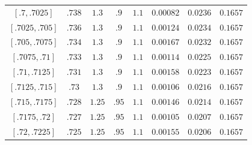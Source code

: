 \documentclass[11pt]{amsart}
\numberwithin{equation}{section}
\theoremstyle{plain}
\theoremstyle{definition}
\theoremstyle{remark}
\newcommand{\1}{\mathbf{1}}
\begin{document}
\begin{center}
\begin{longtable}{@{}cccccccc@{}}
$[.7,.7025]$ & $.738$ & $1.3$ & $.9$ & $1.1$ & $0.00082$ & $0.0236$ & $0.1657$ \\
$[.7025,.705]$ & $.736$ & $1.3$ & $.9$ & $1.1$ & $0.00124$ & $0.0234$ & $0.1657$ \\
$[.705,.7075]$ & $.734$ & $1.3$ & $.9$ & $1.1$ & $0.00167$ & $0.0232$ & $0.1657$ \\
$[.7075,.71]$ & $.733$ & $1.3$ & $.9$ & $1.1$ & $0.00114$ & $0.0225$ & $0.1657$ \\
$[.71,.7125]$ & $.731$ & $1.3$ & $.9$ & $1.1$ & $0.00158$ & $0.0223$ & $0.1657$ \\
$[.7125,.715]$ & $.73$ & $1.3$ & $.9$ & $1.1$ & $0.00106$ & $0.0216$ & $0.1657$ \\
$[.715,.7175]$ & $.728$ & $1.25$ & $.95$ & $1.1$ & $0.00146$ & $0.0214$ & $0.1657$ \\
$[.7175,.72]$ & $.727$ & $1.25$ & $.95$ & $1.1$ & $0.00105$ & $0.0207$ & $0.1657$ \\
$[.72,.7225]$ & $.725$ & $1.25$ & $.95$ & $1.1$ & $0.00155$ & $0.0206$ & $0.1657$ \\
\end{longtable}
\end{center}
\end{document}
